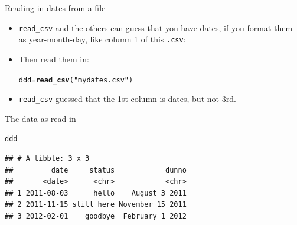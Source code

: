 \documentclass[unknownkeysallowed]{beamer}\usepackage[]{graphicx}\usepackage[]{color}
\makeatletter
\newcommand{\hlstr}[1]{\textcolor[rgb]{0.192,0.494,0.8}{#1}}%
\newcommand{\hlstd}[1]{\textcolor[rgb]{0.345,0.345,0.345}{#1}}%
\newcommand{\hlkwb}[1]{\textcolor[rgb]{0.69,0.353,0.396}{#1}}%
\newcommand{\hlkwd}[1]{\textcolor[rgb]{0.737,0.353,0.396}{\textbf{#1}}}%
\newenvironment{kframe}{%
 \def\at@end@of@kframe{}%
 \ifinner\ifhmode%
  \def\at@end@of@kframe{\end{minipage}}%
  \begin{minipage}{\columnwidth}%
 \fi\fi%
 \def\FrameCommand##1{\hskip\@totalleftmargin \hskip-\fboxsep
 \colorbox{shadecolor}{##1}\hskip-\fboxsep
     \hskip-\linewidth \hskip-\@totalleftmargin \hskip\columnwidth}%
 \MakeFramed {\advance\hsize-\width
   \@totalleftmargin\z@ \linewidth\hsize
   \@setminipage}}%
 {\par\unskip\endMakeFramed%
 \at@end@of@kframe}
\newenvironment{knitrout}{}{} %
\makeatother
\begin{document}
\begin{frame}[fragile]{Reading in dates from a file}
  
  \begin{itemize}
  \item \texttt{read\_csv} and the others can guess that you have
    dates, if you format them as year-month-day, like column 1 of this
    \texttt{.csv}:
    


\item Then read them in:
    
\begin{knitrout}
\color{fgcolor}\begin{kframe}
\begin{alltt}
\hlstd{ddd}\hlkwb{=}\hlkwd{read_csv}\hlstd{(}\hlstr{"mydates.csv"}\hlstd{)}
\end{alltt}


{\ttfamily\noindent\itshape{}}\end{kframe}
\end{knitrout}

\item \texttt{read\_csv} guessed that the 1st column is dates, but not 3rd.
  \end{itemize}
  
\end{frame}

\begin{frame}[fragile]{The data as read in}
  
\begin{knitrout}
\color{fgcolor}\begin{kframe}
\begin{alltt}
\hlstd{ddd}
\end{alltt}
\begin{verbatim}
## # A tibble: 3 x 3
##         date     status            dunno
##       <date>      <chr>            <chr>
## 1 2011-08-03      hello    August 3 2011
## 2 2011-11-15 still here November 15 2011
## 3 2012-02-01    goodbye  February 1 2012
\end{verbatim}
\end{kframe}
\end{knitrout}
  
\end{frame}
\end{document}
